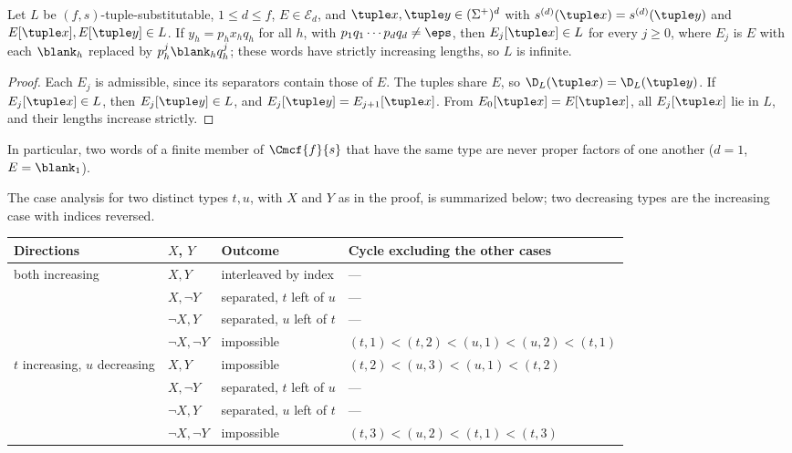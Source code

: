 \begin{lemma}
\label{lem:no-insertion}
Let $L$ be $(f,s)$-tuple-substitutable, $1\le d\le f$, $E\in\mathcal E_d$, and
$\tuple x,\tuple y\in(\Sigma^+)^d$ with $s^{(d)}(\tuple x)=s^{(d)}(\tuple y)$ and
$E[\tuple x],E[\tuple y]\in L$.  If $y_h=p_hx_hq_h$ for all $h$, with
$p_1q_1\cdots p_dq_d\ne\eps$, then $E_j[\tuple x]\in L$ for every $j\ge0$, where $E_j$
is $E$ with each $\blank_h$ replaced by $p_h^j\blank_hq_h^j$; these words have
strictly increasing lengths, so $L$ is infinite.
\end{lemma}

\begin{proof}
Each $E_j$ is admissible, since its separators contain those of
$E$.  The tuples share $E$, so $\D_L(\tuple x)=\D_L(\tuple y)$.  If
$E_j[\tuple x]\in L$, then $E_j[\tuple y]\in L$, and $E_j[\tuple y]=E_{j+1}[\tuple x]$.
From $E_0[\tuple x]=E[\tuple x]$, all $E_j[\tuple x]$ lie in $L$, and their lengths
increase strictly.
\end{proof}

In particular, two words of a finite member of $\Cmcf{f}{s}$ that have the same
type are never proper factors of one another ($d=1$, $E=\blank_1$).


The case analysis for two distinct types $t,u$, with $X$ and $Y$ as in the
proof, is summarized below; two decreasing types are the increasing case with
indices reversed.
\begin{center}
\footnotesize
\setlength{\tabcolsep}{4pt}
\renewcommand{\arraystretch}{1.15}
\begin{tabular}{@{}llll@{}}
\hline
Directions & $X$, $Y$ & Outcome & Cycle excluding the other cases\\
\hline
both increasing & $X,Y$ & interleaved by index & ---\\
 & $X,\neg Y$ & separated, $t$ left of $u$ & ---\\
 & $\neg X,Y$ & separated, $u$ left of $t$ & ---\\
 & $\neg X,\neg Y$ & impossible & $(t,1)<(t,2)<(u,1)<(u,2)<(t,1)$\\
$t$ increasing, $u$ decreasing & $X,Y$ & impossible & $(t,2)<(u,3)<(u,1)<(t,2)$\\
 & $X,\neg Y$ & separated, $t$ left of $u$ & ---\\
 & $\neg X,Y$ & separated, $u$ left of $t$ & ---\\
 & $\neg X,\neg Y$ & impossible & $(t,3)<(u,2)<(t,1)<(t,3)$\\
\hline
\end{tabular}
\end{center}


